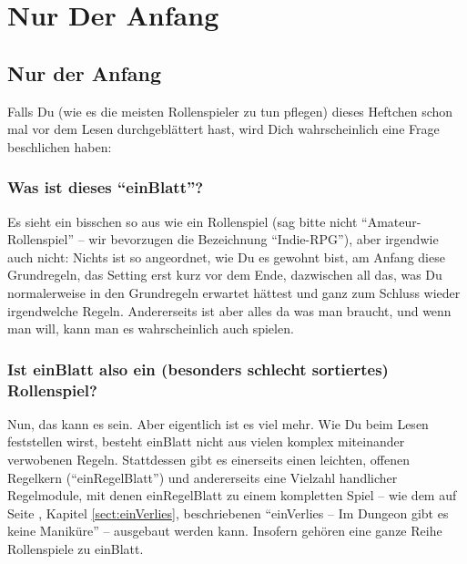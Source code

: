 \part {Nur Der Anfang}
\chapter {Nur der Anfang}

Falls Du (wie es die meisten Rollenspieler zu tun pflegen) dieses Heftchen schon mal vor dem Lesen durchgeblättert hast, wird Dich wahrscheinlich eine Frage beschlichen haben:

\section {Was ist dieses "`einBlatt"'?}
Es sieht ein bisschen so aus wie ein Rollenspiel (sag bitte nicht "`Amateur-Rollenspiel"' -- wir bevorzugen die Bezeichnung "`Indie-RPG"'), aber irgendwie auch nicht: Nichts ist so angeordnet, wie Du es gewohnt bist, am Anfang diese Grundregeln, das Setting erst kurz vor dem Ende, dazwischen all das, was Du normalerweise in den Grundregeln erwartet hättest und ganz zum Schluss wieder irgendwelche Regeln. Andererseits ist aber alles da was man braucht, und wenn man will, kann man es wahrscheinlich auch spielen.

\section {Ist einBlatt also ein (besonders schlecht sortiertes) Rollenspiel?}
Nun, das kann es sein. Aber eigentlich ist es viel mehr. Wie Du beim Lesen feststellen wirst, besteht einBlatt nicht aus vielen komplex miteinander verwobenen Regeln. Stattdessen gibt es einerseits einen leichten, offenen Regelkern ("`einRegelBlatt"') und andererseits eine Vielzahl handlicher Regelmodule, mit denen einRegelBlatt zu einem kompletten Spiel -- wie dem  auf Seite \pageref {sect:einVerlies}, Kapitel \ref {sect:einVerlies}, beschriebenen "`einVerlies -- Im Dungeon gibt es keine Maniküre"' -- ausgebaut werden kann. Insofern gehören eine ganze Reihe Rollenspiele zu einBlatt. 

